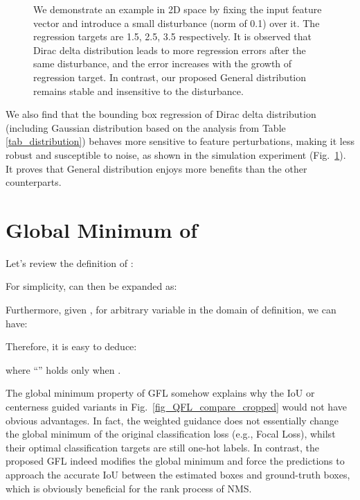 \documentclass{article}
\begin{document}
\begin{figure}[h]
	\begin{center}
		\setlength{\fboxrule}{0pt}
	\end{center}	
	\vspace{-10pt}
	\caption{We demonstrate an example in 2D space by fixing the input feature vector and introduce a small disturbance (norm of 0.1) over it. The regression targets are {1.5, 2.5, 3.5} respectively. It is observed that Dirac delta distribution leads to more regression errors after the same disturbance, and the error increases with the growth of regression target. In contrast, our proposed General distribution remains stable and insensitive to the disturbance.  }
	\label{fig_DFL_drawback_1_cropped}
	\vspace{-6pt}
\end{figure}

We also find that the bounding box regression of Dirac delta distribution (including Gaussian distribution based on the analysis from Table \ref{tab_distribution}) behaves more sensitive to feature perturbations, making it less robust and susceptible to noise, as shown in the simulation experiment (Fig.~\ref{fig_DFL_drawback_1_cropped}). It proves that General distribution enjoys more benefits than the other counterparts.


\section{Global Minimum of }
Let's review the definition of :


For simplicity,  can then be expanded as:



Furthermore, given , for arbitrary variable  in the domain of definition, we can have:

Therefore, it is easy to deduce:

where ``'' holds only when .

The global minimum property of GFL somehow explains why the IoU or centerness guided variants in Fig.~\ref{fig_QFL_compare_cropped} would not have obvious advantages. In fact, the weighted guidance does not essentially change the global minimum of the original classification loss (e.g., Focal Loss), whilst their optimal classification targets are still one-hot labels. In contrast, the proposed GFL indeed modifies the global minimum and force the predictions to approach the accurate IoU between the estimated boxes and ground-truth boxes, which is obviously beneficial for the rank process of NMS.
\end{document}

